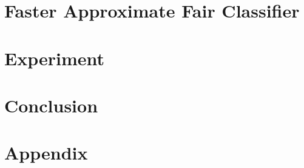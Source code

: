 \documentclass{article}
\begin{document}
\section{Faster Approximate Fair Classifier}

\section{Experiment}

\section{Conclusion}




\appendix
\section{Appendix}

\end{document}
